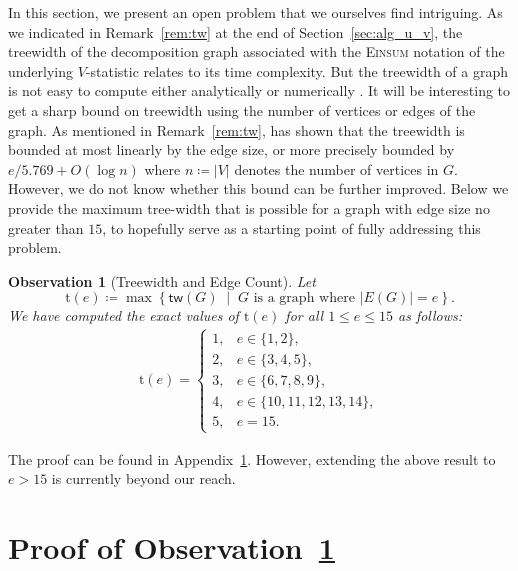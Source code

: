 \documentclass[sn-mathphys, natbib=false]{sn-jnl}
\theoremstyle{plain}
\newtheorem{observation}{Observation}
\theoremstyle{definition}
\def\Einsum{\textsc{Einsum}}
\newcommand{\treewidthp}[1]{\mathsf{tw}(#1)}
\begin{document}
\begin{bibunit}[agsm]
In this section, we present an open problem that we ourselves find intriguing. As we indicated in Remark~\ref{rem:tw} at the end of Section~\ref{sec:alg_u_v}, the treewidth of the decomposition graph associated with the \Einsum{} notation of the underlying $V$-statistic relates to its time complexity. But the treewidth of a graph is not easy to compute either analytically \citep{harvey2018treewidth} or numerically \citep{arnborg1987complexity}. It will be interesting to get a sharp bound on treewidth using the number of vertices or edges of the graph. As mentioned in Remark~\ref{rem:tw}, \citet{kneis2009bound} has shown that the treewidth is bounded at most linearly by the edge size, or more precisely bounded by $e / 5.769 + O (\log n)$ where $n \coloneqq |V|$ denotes the number of vertices in $G$. However, we do not know whether this bound can be further improved. Below we provide the maximum tree-width that is possible for a graph with edge size no greater than $15$, to hopefully serve as a starting point of fully addressing this problem.
\begin{observation}[Treewidth and Edge Count]
\label{pro:treewidth_table}
Let
\begin{equation*}
\mathrm{t}(e) \coloneqq \max \left\{ \treewidthp{G} \;\middle|\; G \text{ is a graph where } |E(G)| = e \right\}.
\end{equation*}
We have computed the exact values of $\mathrm{t} (e)$ for all $1 \le e \le 15$ as follows:
\begin{equation*}
\begin{split}
\mathrm{t} (e) = \left\{ \begin{array}{ll}
1, & e \in \{1, 2\}, \\
2, & e \in \{3, 4, 5\}, \\
3, & e \in \{6, 7, 8, 9\}, \\
4, & e \in \{10, 11, 12, 13, 14\}, \\
5, & e = 15.
\end{array} \right.
\end{split}
\end{equation*}
\end{observation}
The proof can be found in Appendix~\ref{app:treewidtg_table}. However, extending the above result to $e > 15$ is currently beyond our reach.

\section{Proof of Observation~\ref{pro:treewidth_table}}
\label{app:treewidtg_table}



\end{bibunit}
\end{document}
